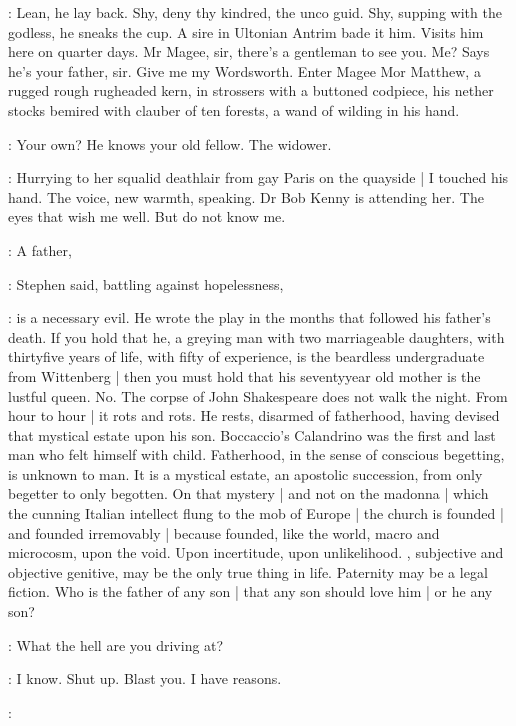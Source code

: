 \StephenInt:
Lean, he lay back.
Shy, deny thy kindred,
the unco guid.
Shy, supping with the godless,
he sneaks the cup.
A sire in Ultonian Antrim bade it him.
Visits him here on quarter days.
Mr Magee, sir,
there's a gentleman to see you.
Me?
Says he's your father, sir.
Give me my Wordsworth.
Enter Magee Mor Matthew,
a rugged rough rugheaded kern,
in strossers with a buttoned codpiece,
his nether stocks bemired with clauber of ten forests,
a wand of wilding in his hand.

\StephenInt:
Your own?
He knows your old fellow.
The widower.

\StephenInt:
Hurrying to her squalid deathlair from gay Paris on the quayside |
I touched his hand.
The voice, new warmth, speaking.
Dr Bob Kenny is attending her.
The eyes that wish me well.
But do not know me.

\Stephen:
A father,

:
Stephen said, battling against hopelessness,

\Stephen:
is a necessary evil.
He wrote the play in the months that followed his father's death.
If you hold that he,
a greying man with two marriageable daughters,
with thirtyfive years of life,
with fifty of experience,
is the beardless undergraduate from Wittenberg |
then you must hold that his seventyyear old mother is the lustful queen.
No.
The corpse of John Shakespeare does not walk the night.
From hour to hour |
it rots and rots.
He rests,
disarmed of fatherhood,
having devised that mystical estate upon his son.
Boccaccio's Calandrino was the first and last man who felt himself with child.
Fatherhood, in the sense of conscious begetting,
is unknown to man.
It is a mystical estate,
an apostolic succession,
from only begetter to only begotten.
On that mystery |
and not on the madonna |
which the cunning Italian intellect flung to the mob of Europe |
the church is founded |
and founded irremovably |
because founded,
like the world,
macro and microcosm,
upon the void.
Upon incertitude,
upon unlikelihood.
,
subjective and objective genitive,
may be the only true thing in life.
Paternity may be a legal fiction.
Who is the father of any son |
that any son should love him |
or he any son?

\StephenInt:
What the hell are you driving at?

\StephenInt:
I know.
Shut up.
Blast you.
I have reasons.

\StephenInt:

